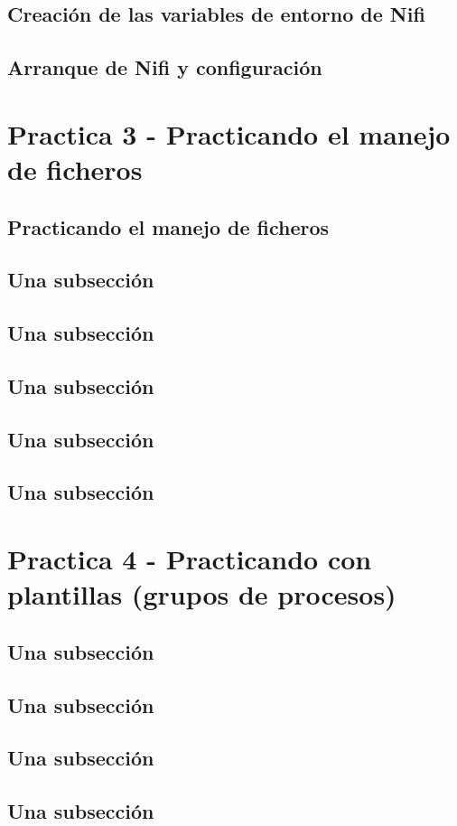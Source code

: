 \documentclass[12pt,a4paper]{article}
\begin{document}
\subsection{Creación de las variables de entorno de Nifi}
\subsection{Arranque de Nifi y configuración}
\section{Practica 3 - Practicando el manejo de ficheros}
\subsection{Practicando el manejo de ficheros}
\subsection{Una subsección}
\subsection{Una subsección}
\subsection{Una subsección}
\subsection{Una subsección}
\subsection{Una subsección}
\section{Practica 4 - Practicando con plantillas (grupos de procesos)}
\subsection{Una subsección}
\subsection{Una subsección}
\subsection{Una subsección}
\subsection{Una subsección}
\end{document}
